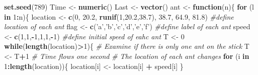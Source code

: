 \documentclass[]{article}
\newenvironment{Shaded}{\begin{snugshade}}{\end{snugshade}}
\newcommand{\KeywordTok}[1]{\textcolor[rgb]{0.13,0.29,0.53}{\textbf{#1}}}
\newcommand{\DecValTok}[1]{\textcolor[rgb]{0.00,0.00,0.81}{#1}}
\newcommand{\FloatTok}[1]{\textcolor[rgb]{0.00,0.00,0.81}{#1}}
\newcommand{\StringTok}[1]{\textcolor[rgb]{0.31,0.60,0.02}{#1}}
\newcommand{\CommentTok}[1]{\textcolor[rgb]{0.56,0.35,0.01}{\textit{#1}}}
\newcommand{\ControlFlowTok}[1]{\textcolor[rgb]{0.13,0.29,0.53}{\textbf{#1}}}
\newcommand{\OperatorTok}[1]{\textcolor[rgb]{0.81,0.36,0.00}{\textbf{#1}}}
\newcommand{\NormalTok}[1]{#1}
\begin{document}
\begin{Shaded}
\begin{Highlighting}[]
\KeywordTok{set.seed}\NormalTok{(}\DecValTok{789}\NormalTok{)}
\NormalTok{Time <-}\StringTok{ }\KeywordTok{numeric}\NormalTok{()}
\NormalTok{Last <-}\StringTok{ }\KeywordTok{vector}\NormalTok{()}
\NormalTok{ant <-}\StringTok{ }\ControlFlowTok{function}\NormalTok{(n)\{}
  \ControlFlowTok{for}\NormalTok{ (l }\ControlFlowTok{in} \DecValTok{1}\OperatorTok{:}\NormalTok{n)\{}
\NormalTok{    location <-}\StringTok{ }\KeywordTok{c}\NormalTok{(}\DecValTok{0}\NormalTok{, }\FloatTok{20.2}\NormalTok{, }\KeywordTok{runif}\NormalTok{(}\DecValTok{1}\NormalTok{,}\FloatTok{20.2}\NormalTok{,}\FloatTok{38.7}\NormalTok{), }\FloatTok{38.7}\NormalTok{, }\FloatTok{64.9}\NormalTok{, }\FloatTok{81.8}\NormalTok{) }\CommentTok{#define location of each ant}
\NormalTok{    flag <-}\StringTok{ }\KeywordTok{c}\NormalTok{(}\StringTok{'a'}\NormalTok{,}\StringTok{'b'}\NormalTok{,}\StringTok{'c'}\NormalTok{,}\StringTok{'d'}\NormalTok{,}\StringTok{'e'}\NormalTok{,}\StringTok{'f'}\NormalTok{) }\CommentTok{#define label of each ant}
\NormalTok{    speed <-}\StringTok{ }\KeywordTok{c}\NormalTok{(}\DecValTok{1}\NormalTok{,}\DecValTok{1}\NormalTok{,}\OperatorTok{-}\DecValTok{1}\NormalTok{,}\DecValTok{1}\NormalTok{,}\DecValTok{1}\NormalTok{,}\OperatorTok{-}\DecValTok{1}\NormalTok{) }\CommentTok{#define initial speed of eahc ant}
\NormalTok{    T <-}\StringTok{ }\DecValTok{0}
    \ControlFlowTok{while}\NormalTok{(}\KeywordTok{length}\NormalTok{(location)}\OperatorTok{>}\DecValTok{1}\NormalTok{)\{ }\CommentTok{# Examine if there is only one ant on the stick}
\NormalTok{      T <-}\StringTok{ }\NormalTok{T}\OperatorTok{+}\DecValTok{1} \CommentTok{# Time flows one second}
      \CommentTok{# The location of each ant changes}
      \ControlFlowTok{for}\NormalTok{ (i }\ControlFlowTok{in} \DecValTok{1}\OperatorTok{:}\KeywordTok{length}\NormalTok{(location))\{}
\NormalTok{        location[i] <-}\StringTok{ }\NormalTok{location[i] }\OperatorTok{+}\StringTok{ }\NormalTok{speed[i]}
\NormalTok{      \}}
      

\end{Highlighting}
\end{Shaded}
\end{document}

